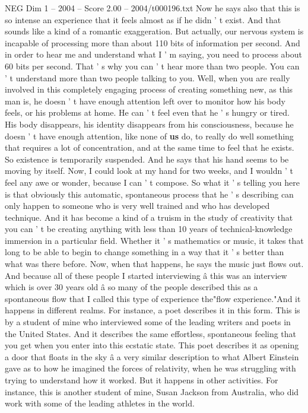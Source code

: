 \begin{textsample}{NEG Dim 1 – 2004 – Score 2.00 – 2004/t000196.txt}
Now he says also that this is so intense an experience that it feels almost as if he didn ' t exist.
And that sounds like a kind of a romantic exaggeration.
But actually, our nervous system is incapable of processing more than about 110 bits of information per second.
And in order to hear me and understand what I ' m saying, you need to process about 60 bits per second.
That ' s why you can ' t hear more than two people.
You can ' t understand more than two people talking to you.
Well, when you are really involved in this completely engaging process of creating something new, as this man is, he doesn ' t have enough attention left over to monitor how his body feels, or his problems at home.
He can ' t feel even that he ' s hungry or tired.
His body disappears, his identity disappears from his consciousness, because he doesn ' t have enough attention, like none of \textbf{us} do, to really do well something that requires a lot of concentration, and at the same time to feel that he exists.
So existence is temporarily suspended.
And he says that his hand seems to be moving by itself.
Now, I could look at my hand for two weeks, and I wouldn ' t feel any awe or wonder, because I can ' t compose.
So what it ' s telling you here is that obviously this automatic, spontaneous process that he ' s describing can only happen to someone who is very well trained and who has developed technique.
And it has become a kind of a truism in the study of creativity that you can ' t be creating anything with less than 10 years of technical-knowledge immersion in a particular field.
Whether it ' s mathematics or music, it takes that long to be able to begin to change something in a way that it ' s better than what was there before.
Now, when that happens, he says the music just flows out.
And because all of these people I started interviewing â this was an interview which is over 30 years old â so many of the people described this as a spontaneous flow that I called this type of experience the"flow experience."And it happens in different realms.
For instance, a poet describes it in this form.
This is by a student of mine who interviewed some of the leading writers and poets in the United States.
And it describes the same effortless, spontaneous feeling that you get when you enter into this ecstatic state.
This poet describes it as opening a door that floats in the sky â a very similar description to what Albert Einstein gave as to how he imagined the forces of relativity, when he was struggling with trying to understand how it worked.
But it happens in other activities.
For instance, this is another student of mine, Susan Jackson from Australia, who did work with some of the leading athletes in the world.

\end{textsample}
